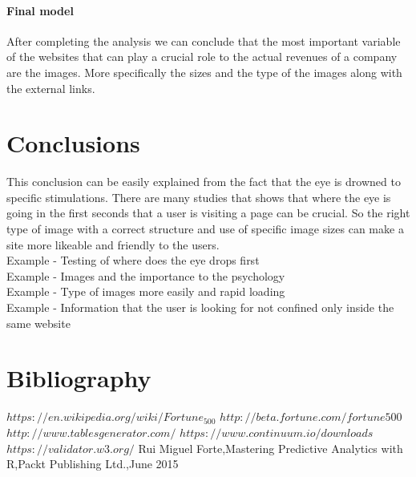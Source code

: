 \documentclass{article}
\begin{document}
\paragraph{Final model}
After completing the analysis we can conclude that the most important variable of the websites that can play a crucial role to the actual revenues of a company are the images. More specifically the sizes and the type of the images along with the external links.
\pagebreak  
\section{Conclusions}
This conclusion can be easily explained from the fact that the eye is drowned to specific stimulations. There are many studies that shows that where the eye is going in the first seconds that a user is visiting a page can be crucial. So the right type of image with a correct structure and use of specific image sizes can make a site more likeable and friendly to the users.\\
Example - Testing of where does the eye drops first\\
Example - Images and the importance to the psychology\\
Example - Type of images more easily and rapid loading\\
Example - Information that the user is looking for not confined only inside the same website\\
\pagebreak  
\section{Bibliography}
\begin{thebibliography}{widest-label}

$https://en.wikipedia.org/wiki/Fortune_500$
$http://beta.fortune.com/fortune500$
$http://www.tablesgenerator.com/$
$https://www.continuum.io/downloads$
$https://validator.w3.org/$
Rui Miguel Forte,Mastering Predictive Analytics with R,Packt Publishing Ltd.,June 2015


\end{thebibliography}

\newpage
\appendix
\end{document}
